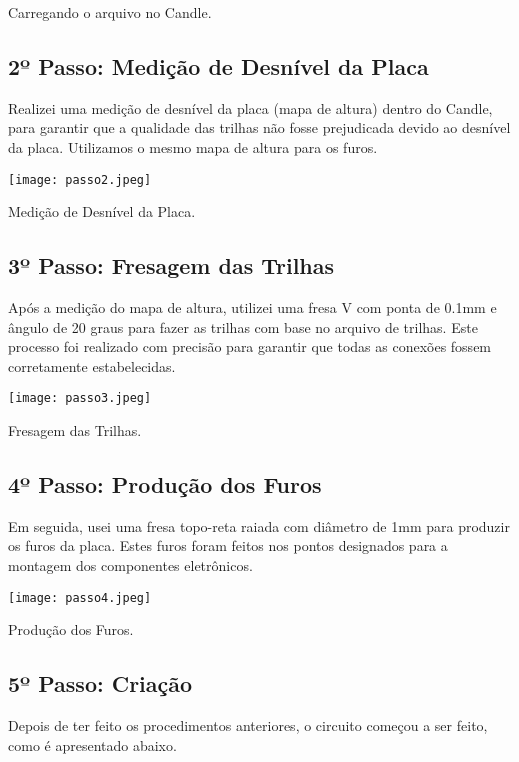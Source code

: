 \documentclass[
]{book}
\begin{document}
Carregando o arquivo no Candle.

\subsection{2º Passo: Medição de Desnível da Placa}\label{uxba-passo-mediuxe7uxe3o-de-desnuxedvel-da-placa}

Realizei uma medição de desnível da placa (mapa de altura) dentro do Candle, para garantir que a qualidade das trilhas não fosse prejudicada devido ao desnível da placa. Utilizamos o mesmo mapa de altura para os furos.

\texttt{[image: passo2.jpeg]}

Medição de Desnível da Placa.

\subsection{3º Passo: Fresagem das Trilhas}\label{uxba-passo-fresagem-das-trilhas}

Após a medição do mapa de altura, utilizei uma fresa V com ponta de 0.1mm e ângulo de 20 graus para fazer as trilhas com base no arquivo de trilhas. Este processo foi realizado com precisão para garantir que todas as conexões fossem corretamente estabelecidas.

\texttt{[image: passo3.jpeg]}

Fresagem das Trilhas.

\subsection{4º Passo: Produção dos Furos}\label{uxba-passo-produuxe7uxe3o-dos-furos}

Em seguida, usei uma fresa topo-reta raiada com diâmetro de 1mm para produzir os furos da placa. Estes furos foram feitos nos pontos designados para a montagem dos componentes eletrônicos.

\texttt{[image: passo4.jpeg]}

Produção dos Furos.

\subsection{5º Passo: Criação}\label{uxba-passo-criauxe7uxe3o}

Depois de ter feito os procedimentos anteriores, o circuito começou a ser feito, como é apresentado abaixo.
\end{document}

